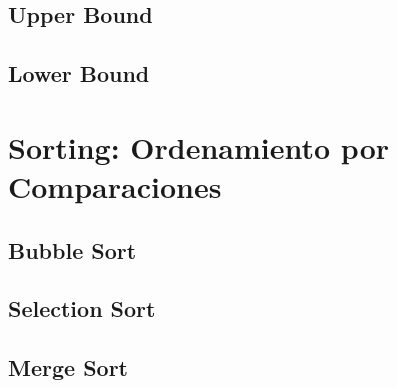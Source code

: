 \documentclass[12pt, fleqn]{report}                             %
\theoremstyle{break}                                            %
\begin{document}
        \section{Upper Bound}

        \section{Lower Bound}



    \clearpage
    \chapter{Sorting: Ordenamiento por Comparaciones}

        \section{Bubble Sort}

        \section{Selection Sort}

        \section{Merge Sort}
\end{document}
